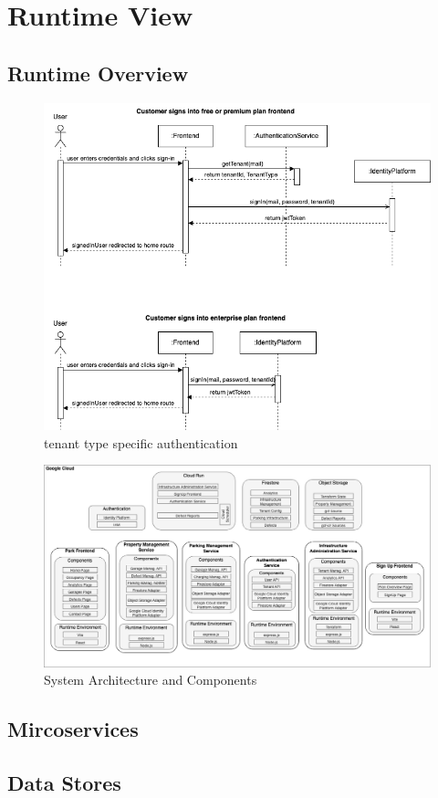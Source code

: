 \section{Runtime View}
\subsection{Runtime Overview}

\begin{figure}[ht]
  \centering
  \includegraphics[width=\textwidth]{resources/03-authentication-sequence.drawio.png}
  \caption{tenant type specific authentication}
  \label{fig:authentication-sequence}
\end{figure}

\begin{figure}[ht]
  \centering
  \includegraphics[width=\textwidth]{resources/03-system-architecture.png}
  \caption{System Architecture and Components }
  \label{fig:system-architecture}
\end{figure}

\subsection{Mircoservices}
\subsection{Data Stores}